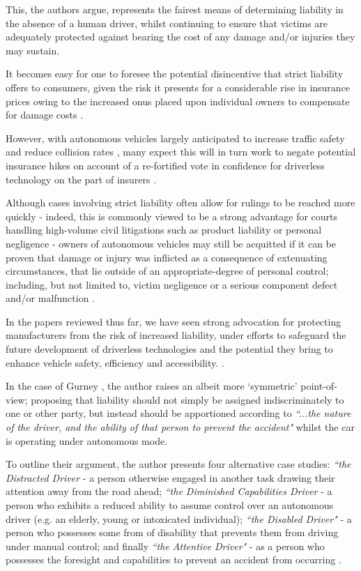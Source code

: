 \documentclass[conference]{IEEEtran}
\begin{document}
This, the authors argue, represents the fairest means of determining liability in the absence of a human driver, whilst continuing to ensure that victims are adequately protected against bearing the cost of any damage and/or injuries they may sustain. 

It becomes easy for one to foresee the potential disincentive that strict liability offers to consumers, given the risk it presents for a considerable rise in insurance prices owing to the increased onus placed upon individual owners to compensate for damage costs \cite{duffy}. 

However, with autonomous vehicles largely anticipated to increase traffic safety and reduce collision rates \cite{duffy, marchant, schellekens}, many expect this will in turn work to negate potential insurance hikes on account of a re-fortified vote in confidence for driverless technology on the part of insurers \cite{duffy, marchant}. 

Although cases involving strict liability often allow for rulings to be reached more quickly - indeed, this is commonly viewed to be a strong advantage for courts handling high-volume civil litigations such as product liability or personal negligence \cite{duffy} - owners of autonomous vehicles may still be acquitted if it can be proven that damage or injury was inflicted as a consequence of extenuating circumstances, that lie outside of an appropriate-degree of personal control; including, but not limited to, victim negligence or a serious component defect and/or malfunction \cite{duffy}.


In the papers reviewed thus far, we have seen strong advocation for protecting manufacturers from the risk of increased liability, under efforts to safeguard the future development of driverless technologies and the potential they bring to enhance vehicle safety, efficiency and accessibility. \cite{beiker, schellekens, marchant}. 


In the case of Gurney \cite{gurney}, the author raises an albeit more `symmetric' point-of-view; proposing that liability should not simply be assigned indiscriminately to one or other party, but instead should be apportioned according to \textit{``...the nature of the driver, and the ability of that person to prevent the accident"} whilst the car is operating under autonomous mode. 

To outline their argument, the author presents four alternative case studies: \textit{``the Distracted Driver} - a person otherwise engaged in another task drawing their attention away from the road ahead; \textit{``the Diminished Capabilities Driver} - a person who exhibits a reduced ability to assume control over an autonomous driver (e.g. an elderly, young or intoxicated individual); \textit{``the Disabled Driver"} - a person who possesses some from of disability that prevents them from driving under manual control; and finally \textit{``the Attentive Driver"} - as a person who possesses the foresight and capabilities to prevent an accident from occurring \cite{gurney}. 
\end{document}
